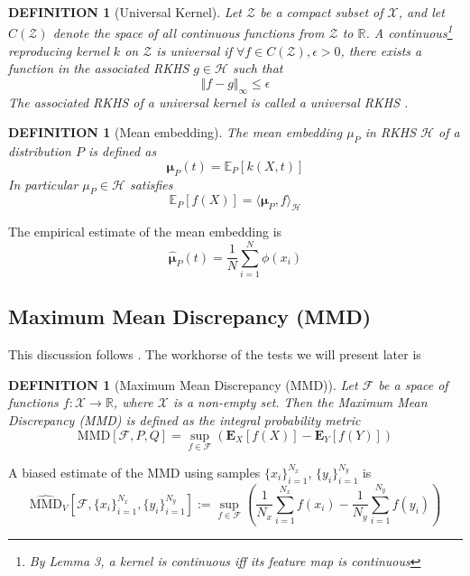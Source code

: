 \documentclass[a4paper,11pt]{article}
\newtheorem{definition}[theorem]{DEFINITION}
\newcommand{\E}{\mathbb{E}}
\begin{document}
\begin{definition}[Universal Kernel]
Let $\mathcal{Z}$ be a compact subset of $\mathcal{X}$, and let $C(\mathcal{Z})$ denote the space of all continuous functions from $\mathcal{Z}$ to $\mathbb{R}$. A continuous\footnote{By \cite{steinwart_uence_nodate} Lemma 3, a kernel is continuous iff its feature map is continuous} reproducing kernel $k$ on $\mathcal{Z}$ is universal if $\forall f \in C(\mathcal{Z}), \epsilon>0$, there exists a function in the associated RKHS $g \in \mathcal{H}$ such that 
$$ \Vert f-g \Vert_{\infty} \leq \epsilon $$
The associated RKHS of a universal kernel is called a universal RKHS \cite{steinwart_uence_nodate}.
\end{definition}

\begin{definition}[Mean embedding]
The mean embedding $\mu_{P}$ in RKHS $\mathcal{H}$ of a distribution $P$ is defined as 
    \begin{equation}
        \mathbf{\mu}_{P}(t) = \E_{P}[k(X, t)]
    \end{equation}    
    In particular $\mu_{P} \in \mathcal{H}$ satisfies
    \begin{equation}
        \E_{P}[f(X)] = \langle \mathbf{\mu}_{P}, f \rangle_{\mathcal{H}}
    \end{equation}
\end{definition}
The empirical estimate of the mean embedding is 
\begin{equation}
    \hat{\mathbf{\mu}}_{P}(t) = \frac{1}{N}\sum_{i=1}^{N}\phi(x_{i})
\end{equation}

\subsection{Maximum Mean Discrepancy (MMD)}
This discussion follows \cite{gretton_kernel_2012}. The workhorse of the tests we will present later is 
\begin{definition}[Maximum Mean Discrepancy (MMD)]
Let $\mathcal{F}$ be a space of functions $f:\mathcal{X}\rightarrow \mathbb{R}$, where $\mathcal{X}$ is a non-empty set. Then the Maximum Mean Discrepancy (MMD) is defined as the integral probability metric
    \begin{equation}
        \mathrm{MMD}[\mathcal{F}, P, Q]=\sup _{f \in \mathcal{F}}\left(\mathbf{E}_{X}[f(X)]-\mathbf{E}_{Y}[f(Y)]\right)
    \label{eq:mmd}
    \end{equation}
\end{definition}
A biased estimate of the MMD using samples $\{x_{i}\}_{i=1}^{N_{x}}$, $\{y_{i}\}_{i=1}^{N_{y}}$ is
\begin{equation}
    \widehat{\mathrm{MMD}}_{V}[\mathcal{F}, \{x_{i}\}_{i=1}^{N_{x}}, \{y_{i}\}_{i=1}^{N_{y}}]:=\sup _{f \in \mathcal{F}}\left(\frac{1}{N_{x}}\sum_{i=1}^{N_{x}}f(x_{i})-\frac{1}{N_{y}}\sum_{i=1}^{N_{y}}f(y_{i})\right)
\end{equation}
\end{document}
